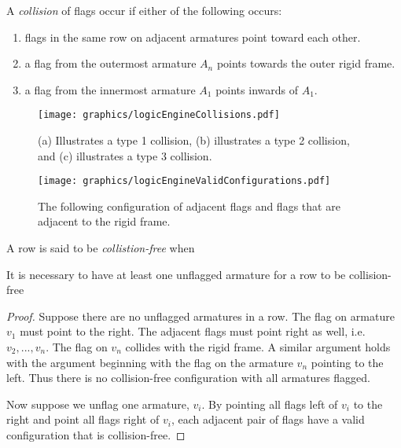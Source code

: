 A \textit{collision} of flags occur if either of the following occurs:
\begin{enumerate}
\item flags in the same row on adjacent armatures point toward each other.
\item a flag from the outermost armature $A_n$ points towards the outer rigid frame.
\item a flag from the innermost armature $A_1$ points inwards of $A_1$.
\end{enumerate}
\begin{figure}[!htbp]
\begin{center}
\texttt{[image: graphics/logicEngineCollisions.pdf]}
\caption{(a) Illustrates a type 1 collision, (b) illustrates a type 2 collision, and (c) 
illustrates a type 3 collision.}\label{fig:logicEngineCollisions.pdf}
\end{center}

\end{figure}
\begin{figure}[!htbp]
\begin{center}
\texttt{[image: graphics/logicEngineValidConfigurations.pdf]}
\caption{The following configuration of adjacent flags 
and flags that are adjacent to the rigid frame.}\label{fig:logicEngineValidConfigurations.pdf}
\end{center}
\end{figure}
A row is said to be \textit{collistion-free} when 
\begin{lem}It is necessary to have at least one unflagged armature for a row to be collision-free \end{lem}
\begin{proof}
Suppose there are no unflagged armatures in a row.  The flag on armature $v_1$ must point to the right.  The adjacent flags must point right as well, i.e. $v_2, ..., v_n$.  The flag on $v_n$ collides with the rigid frame.  A similar argument holds with the argument beginning with the flag on the armature $v_n$ pointing to the left.  Thus there is no collision-free configuration with all armatures flagged.

Now suppose we unflag one armature, $v_i$.  By pointing all flags left of $v_i$ to the right and  point all flags right of $v_i$, each adjacent pair of flags have a valid configuration that is collision-free.
\end{proof}

